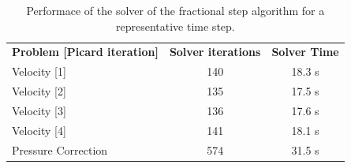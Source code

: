 \documentclass[11pt,a4paper,oneside,reqno]{amsart}
\begin{document}

\begin{table}[]
\caption{Performace of the solver of the fractional step algorithm for a representative time step.}
\label{tab:Solver}
\begin{tabular}{lcc}
\textbf{Problem [Picard iteration]}       & \multicolumn{1}{l}{\textbf{Solver iterations}} & \multicolumn{1}{l}{\textbf{Solver Time}} \\
Velocity [1]          & 140                                     & 18.3 s                                  \\
Velocity [2]          & 135                                     & 17.5 s                                  \\
Velocity [3]          & 136                                     & 17.6 s                                  \\
Velocity [4]          & 141                                     & 18.1 s                                  \\
Pressure Correction & 574                               & 31.5 s                                 
\end{tabular}
\end{table}
\end{document}
